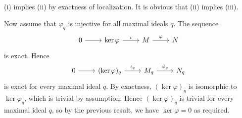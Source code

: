 (i) implies (ii) by exactness of localization. It is obvious that (ii) implies
(iii).

Now assume that $\varphi_q$ is injective for all maximal ideals $q$.
The sequence
\[\begin{tikzcd}
	0 \arrow[r] & \ker\varphi \arrow[r, "\iota"] & M \arrow[r, "\varphi"] & N
\end{tikzcd}\]
is exact. Hence
\[\begin{tikzcd}
	0 \arrow[r] & (\ker\varphi)_q \arrow[r, "\iota_q"] & M_q \arrow[r, "\varphi_q"] & N_q
\end{tikzcd}\]
is exact for every maximal ideal $q$. By exactness, $(\ker\varphi)_q$ is
isomorphic to $\ker \varphi_q$, which is trivial by assumption. Hence
$(\ker\varphi)_q$ is trivial for every maximal ideal $q$, so by the previous
result, we have $\ker\varphi = 0$ as required.
